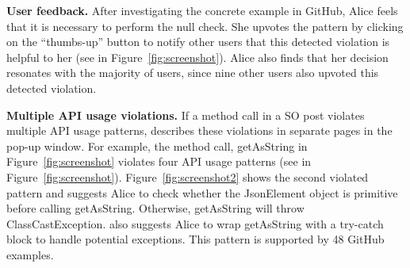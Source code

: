 {\bf User feedback.} After investigating the concrete example in GitHub, Alice feels that it is necessary to perform the {\ttt null} check. She upvotes the pattern by clicking on the ``thumbs-up'' button to notify other users that this detected violation is helpful to her (see  in Figure~\ref{fig:screenshot}). Alice also finds that her decision resonates with the majority of {\tool} users, since nine other users also upvoted this detected violation.

{\bf Multiple API usage violations.} If a method call in a SO post violates multiple API usage patterns, {\tool} describes these violations in separate pages in the pop-up window. For example, the method call, {\ttt getAsString} in Figure~\ref{fig:screenshot} violates four API usage patterns (see  in Figure~\ref{fig:screenshot}). Figure~\ref{fig:screenshot2} shows the second violated pattern and suggests Alice to check whether the {\ttt JsonElement} object is primitive before calling {\ttt getAsString}. Otherwise, {\ttt getAsString} will throw {\ttt ClassCastException}. {\tool} also suggests Alice to wrap {\ttt getAsString} with a {\ttt try-catch} block to handle potential exceptions. This pattern is supported by 48 GitHub examples.


